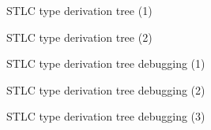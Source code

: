 \documentclass{beamer}
\begin{document}
\begin{frame}{STLC type derivation tree (1)}
\begin{center}
{\tiny

}
\end{center}
\end{frame}

\begin{frame}{STLC type derivation tree (2)}
\begin{center}
{\tiny

}
\end{center}
\end{frame}

\begin{frame}{STLC type derivation tree debugging (1)}
\begin{center}
{\tiny

}
\end{center}
\end{frame}

\begin{frame}{STLC type derivation tree debugging (2)}
\begin{center}
{\tiny

}
\end{center}
\end{frame}

\begin{frame}{STLC type derivation tree debugging (3)}
\begin{center}
{\tiny

}
\end{center}
\end{frame}
\end{document}
